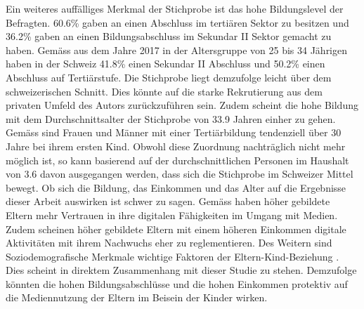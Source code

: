 Ein weiteres auffälliges Merkmal der Stichprobe ist das hohe Bildungslevel der Befragten. 60.6\% gaben an einen Abschluss im tertiären Sektor zu besitzen und 36.2\% gaben an einen Bildungsabschluss im Sekundar II Sektor gemacht zu haben. Gemäss  aus dem Jahre 2017 in der Altersgruppe von 25 bis 34 Jährigen haben in der Schweiz 41.8\% einen Sekundar II Abschluss und 50.2\% einen Abschluss auf Tertiärstufe. Die Stichprobe liegt demzufolge leicht über dem schweizerischen Schnitt. Dies könnte auf die starke Rekrutierung aus dem privaten Umfeld des Autors zurückzuführen sein. Zudem scheint die hohe Bildung mit dem Durchschnittsalter der Stichprobe von 33.9 Jahren einher zu gehen. Gemäss  sind  Frauen und Männer mit einer Tertiärbildung tendenziell über 30 Jahre bei ihrem ersten Kind. Obwohl diese Zuordnung nachträglich nicht mehr möglich ist, so kann basierend auf der durchschnittlichen Personen im Haushalt von 3.6 davon ausgegangen werden, dass sich die Stichprobe im Schweizer Mittel bewegt. Ob sich die Bildung, das Einkommen und das Alter auf die Ergebnisse dieser Arbeit auswirken ist schwer zu sagen. Gemäss  haben höher gebildete Eltern mehr Vertrauen in ihre digitalen Fähigkeiten im Umgang mit Medien. Zudem scheinen höher gebildete Eltern mit einem höheren Einkommen digitale Aktivitäten mit ihrem Nachwuchs eher zu reglementieren. Des Weitern sind Soziodemografische Merkmale wichtige Faktoren der Eltern-Kind-Beziehung \cite{Kammerl2012}. Dies scheint in direktem Zusammenhang mit dieser Studie zu stehen. Demzufolge könnten die hohen Bildungsabschlüsse und die hohen Einkommen protektiv auf die Mediennutzung der Eltern im Beisein der Kinder wirken. 

